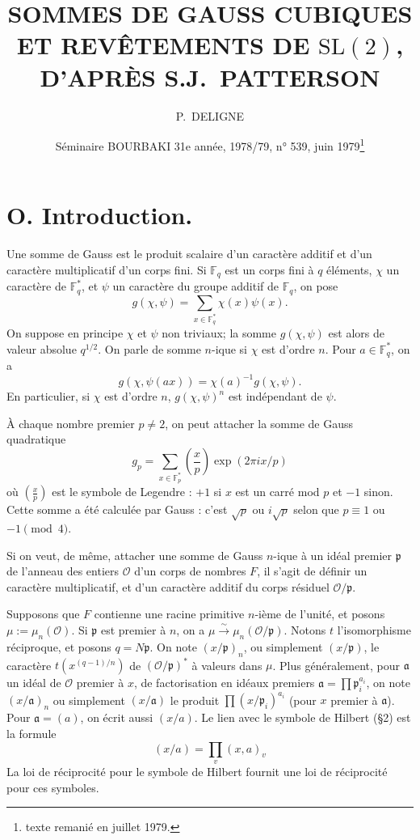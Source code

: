 \documentclass[12pt,a4paper]{article}
\title{SOMMES DE GAUSS CUBIQUES ET REVÊTEMENTS DE $\mathrm{SL}(2)$,\\D'APRÈS S.J.~PATTERSON}
\author{P.~DELIGNE}
\date{Séminaire BOURBAKI 31e année, 1978/79, n° 539, juin 1979\footnote{texte remanié en juillet 1979.}}
\theoremstyle{plain}
\theoremstyle{definition}
\theoremstyle{remark}
\newcommand{\FF}{\mathbb{F}}
\newcommand{\cO}{\mathcal{O}}
\newcommand{\frakp}{\mathfrak{p}}
\newcommand{\fraka}{\mathfrak{a}}
\providecommand{\FF}{\mathbb{F}}
\providecommand{\cO}{\mathcal{O}}
\providecommand{\fraka}{\mathfrak{a}}
\providecommand{\frakp}{\mathfrak{p}}
\begin{document}
\maketitle

\section*{O. Introduction.}

Une somme de Gauss est le produit scalaire d'un caractère additif et d'un caractère multiplicatif d'un corps fini. Si $\FF_q$ est un corps fini à $q$ éléments, $\chi$ un caractère de $\FF_q^*$, et $\psi$ un caractère du groupe additif de $\FF_q$, on pose
\[
g(\chi, \psi) = \sum_{x \in \FF_q^*} \chi(x) \psi(x).
\]
On suppose en principe $\chi$ et $\psi$ non triviaux; la somme $g(\chi, \psi)$ est alors de valeur absolue $q^{1/2}$. On parle de somme $n$-ique si $\chi$ est d'ordre $n$. Pour $a \in \FF_q^*$, on a
\begin{equation}\label{eq:0.1}
g(\chi, \psi(ax)) = \chi(a)^{-1} g(\chi, \psi).
\tag{0.1}
\end{equation}
En particulier, si $\chi$ est d'ordre $n$, $g(\chi, \psi)^n$ est indépendant de $\psi$.

À chaque nombre premier $p \neq 2$, on peut attacher la somme de Gauss quadratique
\[
g_p = \sum_{x \in \FF_p^*} \left(\frac{x}{p}\right) \exp(2\pi i x/p)
\]
 où $\left(\frac{x}{p}\right)$ est le symbole de Legendre : $+1$ si $x$ est un carré mod $p$ et $-1$ sinon. Cette somme a été calculée par Gauss : c'est $\sqrt{p}$ ou $i\sqrt{p}$ selon que $p \equiv 1$ ou $-1 \pmod 4$.

Si on veut, de même, attacher une somme de Gauss $n$-ique à un idéal premier $\frakp$ de l'anneau des entiers $\cO$ d'un corps de nombres $F$, il s'agit de définir un caractère multiplicatif, et d'un caractère additif du corps résiduel $\cO/\frakp$.

Supposons que $F$ contienne une racine primitive $n$-ième de l'unité, et posons $\mu := \mu_n(\cO)$. Si $\frakp$ est premier à $n$, on a $\mu \xrightarrow{\sim} \mu_n(\cO/\frakp)$. Notons $t$ l'isomorphisme réciproque, et posons $q = N\frakp$. On note $(x/\frakp)_n$, ou simplement $(x/\frakp)$, le caractère $t(x^{(q-1)/n})$ de $(\cO/\frakp)^*$ à valeurs dans $\mu$. Plus généralement, pour $\fraka$ un idéal de $\cO$ premier à $x$, de factorisation en idéaux premiers $\fraka = \prod \frakp_i^{a_i}$, on note $(x/\fraka)_n$ ou simplement $(x/\fraka)$ le produit $\prod (x/\frakp_i)^{a_i}$ (pour $x$ premier à $\fraka$). Pour $\fraka = (a)$, on écrit aussi $(x/a)$. Le lien avec le symbole de Hilbert (\S 2) est la formule
\[
(x/a) = \prod_v (x, a)_v
\]
La loi de réciprocité pour le symbole de Hilbert fournit une loi de réciprocité pour ces symboles.
\end{document}
